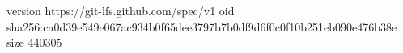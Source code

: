 version https://git-lfs.github.com/spec/v1
oid sha256:ca0d39e549e067ac934b0f65dee3797b7b0df9d6f0c0f10b251eb090e476b38e
size 440305
